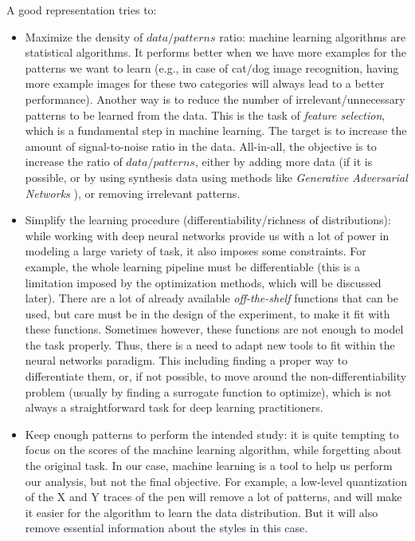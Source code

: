   A good representation tries to:
  \begin{itemize}[noitemsep]
      \item Maximize the density of $data/patterns$ ratio: machine learning algorithms are statistical algorithms. It performs better when we have more examples for the patterns we want to learn (e.g., in case of cat/dog image recognition, having more example images for these two categories will always lead to a better performance).
      Another way is to reduce the number of irrelevant/unnecessary patterns to be learned from the data. This is the task of \textit{feature selection}, which is a fundamental step in machine learning. The target is to increase the amount of signal-to-noise ratio in the data.
      All-in-all, the objective is to increase the ratio of $data/patterns$, either by adding more data (if it is possible, or by using synthesis data using methods like \textit{Generative Adversarial Networks} \citep{goodfellow2014generative}), or removing irrelevant patterns.
      \item Simplify the learning procedure (differentiability/richness of distributions): while working with deep neural networks provide us with a lot of power in modeling a large variety of task, it also imposes some constraints.
      For example, the whole learning pipeline must be differentiable (this is a limitation imposed by the optimization methods, which will be discussed later). There are a lot of already available \textit{off-the-shelf} functions that can be used, but care must be in the design of the experiment, to make it fit with these functions.
      Sometimes however, these functions are not enough to model the task properly. Thus, there is a need to adapt new tools to fit within the neural networks paradigm. This including finding a proper way to differentiate them, or, if not possible, to move around the non-differentiability problem (usually by finding a surrogate function to optimize), which is not always a straightforward task for deep learning practitioners.
      \item Keep enough patterns to perform the intended study: it is quite tempting to focus on the scores of the machine learning algorithm, while forgetting about the original task. In our case, machine learning is a tool to help us perform our analysis, but not the final objective. For example, a low-level quantization of the X and Y traces of the pen will remove a lot of patterns, and will make it easier for the algorithm to learn the data distribution. But it will also remove essential information about the styles in this case.
  \end{itemize}

